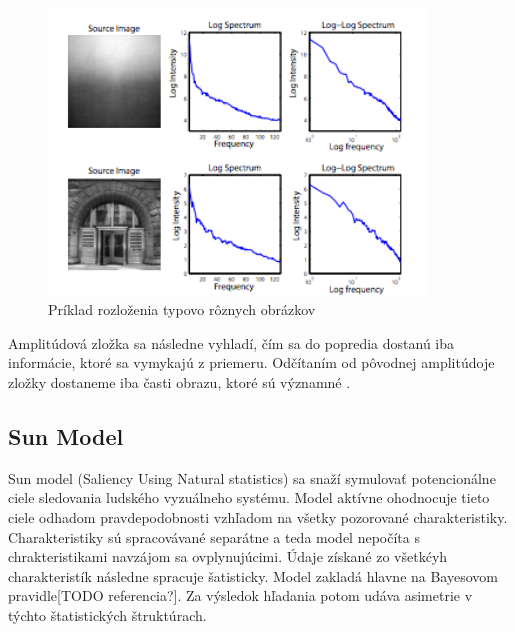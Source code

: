 \begin{figure}[H]
  \centering
  \includegraphics[width=10cm]{pics/spectral-rezidual-1.png}
  \caption{Príklad rozloženia typovo rôznych obrázkov}\label{wrap-fig:2}
\end{figure}
\vspace{10mm}

Amplitúdová zložka sa následne vyhladí, čím sa do popredia dostanú iba informácie, ktoré sa vymykajú z priemeru.
Odčítaním od pôvodnej amplitúdoje zložky dostaneme iba časti obrazu, ktoré sú významné \cite{spectral-rezidual}.
\subsection{Sun Model}
Sun model (Saliency Using Natural statistics) sa snaží symulovať potencionálne ciele sledovania ludského vyzuálneho systému.
Model aktívne ohodnocuje tieto ciele odhadom pravdepodobnosti vzhľadom na všetky pozorované charakteristiky.
Charakteristiky sú spracovávané separátne a teda model nepočíta s chrakteristikami navzájom sa ovplynujúcimi.
Údaje získané zo všetkćyh charakteristík  následne spracuje šatisticky.
Model zakladá hlavne na Bayesovom pravidle[TODO referencia?].
Za výsledok hľadania potom udáva asimetrie v týchto štatistických štruktúrach\cite{sun-1}.
